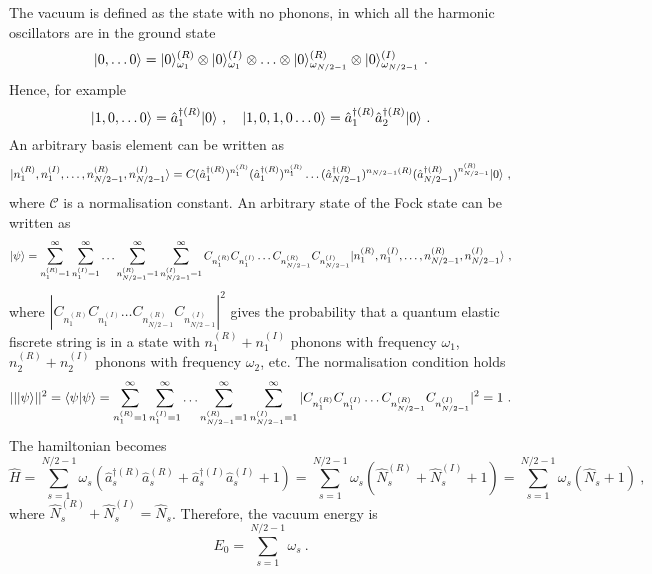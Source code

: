     The vacuum is defined as the state with no phonons, in which all the harmonic oscillators are in the ground state
    \begin{equation*}
        \vert0, \ldots 0\rangle = \vert0\rangle_{\omega_1}^{(R)} \otimes \vert0\rangle_{\omega_1}^{(I)} \otimes \ldots \otimes \vert0\rangle_{\omega_{N/2-1}}^{(R)} \otimes \vert0\rangle_{\omega_{N/2-1}}^{(I)} ~.
    \end{equation*}
    Hence, for example
    \begin{equation*}
        \vert1, 0, \ldots 0\rangle = \hat a^{\dagger(R)}_1 \vert0\rangle ~, \quad \vert1, 0, 1, 0 \ldots 0\rangle = \hat a^{\dagger(R)}_1 \hat a^{\dagger(R)}_2 \vert0\rangle ~.
    \end{equation*}
    An arbitrary basis element can be written as 
    \begin{equation*}
        \vert n_1^{(R)}, n_1^{(I)}, \ldots, n_{N/2-1}^{(R)}, n_{N/2-1}^{(I)}\rangle = C (\hat a_1^{\dagger (R)})^{n_1^{(R)}} (\hat a_1^{\dagger (R)})^{n_1^{(R)}} \ldots (\hat a_{N/2-1}^{\dagger (R)})^{n_{N/2-1}{(R)}} (\hat a_{N/2-1}^{\dagger (R)})^{n_{N/2-1}^{(R)}} \vert0\rangle ~,
    \end{equation*}
    where $\mathcal C$ is a normalisation constant.
    An arbitrary state of the Fock state can be written as 
    \begin{equation*}
        \vert\psi\rangle = \sum_{n_1^{(R)} = 1}^\infty \sum_{n_1^{(I)} = 1}^\infty \ldots \sum_{n_{N/2-1}^{(R)} = 1}^\infty \sum_{n_{N/2-1}^{(I)} = 1}^\infty C_{n_1^{(R)}} C_{n_1^{(I)}} \ldots C_{n_{N/2-1}^{(R)}} C_{n_{N/2-1}^{(I)}} \vert n_1^{(R)}, n_1^{(I)}, \ldots, n_{N/2-1}^{(R)}, n_{N/2-1}^{(I)}\rangle ~,
    \end{equation*}
    where $|C_{n_1^{(R)}} C_{n_1^{(I)}} \ldots C_{n_{N/2-1}^{(R)}} C_{n_{N/2-1}^{(I)}}|^2$ gives the probability that a quantum elastic fiscrete string is in a state with $n_1^{(R)} + n_1^{(I)}$ phonons with frequency $\omega_1$, $n_2^{(R)} + n_2^{(I)}$ phonons with frequency $\omega_2$, etc. The normalisation condition holds 
    \begin{equation*}
        ||\vert\psi\rangle||^2 = \langle\psi\vert\psi\rangle = \sum_{n_1^{(R)} = 1}^\infty \sum_{n_1^{(I)} = 1}^\infty \ldots \sum_{n_{N/2-1}^{(R)} = 1}^\infty \sum_{n_{N/2-1}^{(I)} = 1}^\infty |C_{n_1^{(R)}} C_{n_1^{(I)}} \ldots C_{n_{N/2-1}^{(R)}} C_{n_{N/2-1}^{(I)}}|^2 = 1 ~.
    \end{equation*}
    The hamiltonian becomes 
    \begin{equation*}
        \hat H = \sum_{s=1}^{N/2-1} \omega_s (\hat a^{\dagger(R)}_s \hat a^{(R)}_s + \hat a^{\dagger(I)}_s \hat a^{(I)}_s + 1) = \sum_{s=1}^{N/2-1} \omega_s (\hat N^{(R)}_s + \hat N^{(I)}_s + 1) = \sum_{s=1}^{N/2-1} \omega_s (\hat N_s + 1) ~,
    \end{equation*}
    where $\hat N^{(R)}_s + \hat N^{(I)}_s = \hat N_s$. Therefore, the vacuum energy is 
    \begin{equation*}
        E_0 = \sum_{s=1}^{N/2-1} \omega_s ~.
    \end{equation*}

